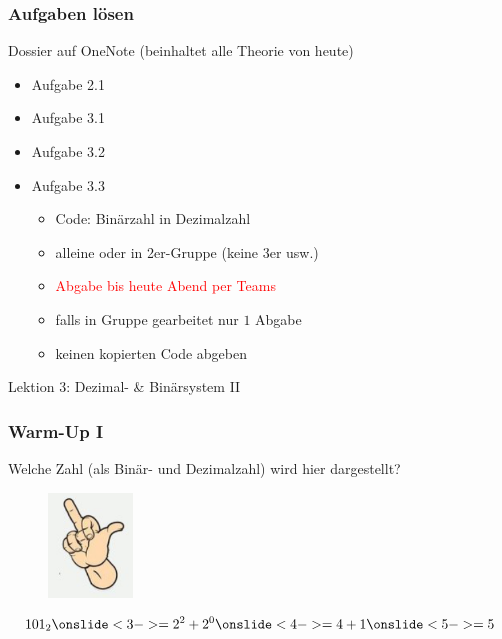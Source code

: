 \documentclass{beamer}
\begin{document}
\begin{frame}
    \frametitle{Aufgaben lösen}
    Dossier auf OneNote (beinhaltet alle Theorie von heute)
    \begin{itemize}
        \item Aufgabe 2.1
        \item Aufgabe 3.1
        \item Aufgabe 3.2
        \item Aufgabe 3.3
        \begin{itemize}
            \vspace{-\topsep}
            \item Code: Binärzahl in Dezimalzahl
            \item alleine oder in 2er-Gruppe (keine 3er usw.)
            \item \textcolor{red}{Abgabe bis heute Abend per Teams}
            \item falls in Gruppe gearbeitet nur $1$ Abgabe
            \item keinen kopierten Code abgeben
        \end{itemize}
        
    \end{itemize}
\end{frame}


\begin{frame}
    \LARGE
    Lektion 3: Dezimal- \& Binärsystem II
\end{frame}

\begin{frame}
    \frametitle{Warm-Up I}
    Welche Zahl (als Binär- und Dezimalzahl) wird hier dargestellt?
    \begin{figure}[H]
        \centering
        \includegraphics[width=0.2\textwidth]{hand_5}
    \end{figure}
     $$101_2
    \onslide<3->= 2^2 + 2^0
    \onslide<4->= 4+1
    \onslide<5->= 5$$
\end{frame}
\end{document}
